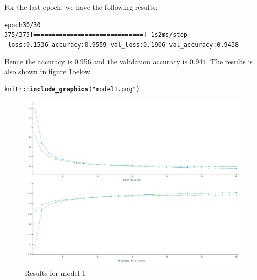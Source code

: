 \documentclass[10pt, a4paper, english]{article}\usepackage[]{graphicx}\usepackage[dvipsnames]{xcolor}
\makeatletter
\def\maxwidth{ %
  \ifdim\Gin@nat@width>\linewidth
    \linewidth
  \else
    \Gin@nat@width
  \fi
}
\newcommand{\hlstr}[1]{\textcolor[rgb]{0.192,0.494,0.8}{#1}}%
\newcommand{\hlopt}[1]{\textcolor[rgb]{0,0,0}{#1}}%
\newcommand{\hlstd}[1]{\textcolor[rgb]{0.345,0.345,0.345}{#1}}%
\newcommand{\hlkwd}[1]{\textcolor[rgb]{0.737,0.353,0.396}{\textbf{#1}}}%
\newenvironment{kframe}{%
 \def\at@end@of@kframe{}%
 \ifinner\ifhmode%
  \def\at@end@of@kframe{\end{minipage}}%
  \begin{minipage}{\columnwidth}%
 \fi\fi%
 \def\FrameCommand##1{\hskip\@totalleftmargin \hskip-\fboxsep
 \colorbox{shadecolor}{##1}\hskip-\fboxsep
     \hskip-\linewidth \hskip-\@totalleftmargin \hskip\columnwidth}%
 \MakeFramed {\advance\hsize-\width
   \@totalleftmargin\z@ \linewidth\hsize
   \@setminipage}}%
 {\par\unskip\endMakeFramed%
 \at@end@of@kframe}
\newenvironment{knitrout}{}{} %
\makeatother
\begin{document}
For the last epoch, we have the following results:
\begin{knitrout}
\color{fgcolor}\begin{kframe}
\begin{alltt}
epoch 30/30
375/375 [==============================] - 1s 2ms/step 
- loss: 0.1536 - accuracy: 0.9559 - val_loss: 0.1906 - val_accuracy: 0.9438
\end{alltt}
\end{kframe}
\end{knitrout}

Hence the accuracy is 0.956 and the validation accuracy is 0.944. The results is also shown in figure \ref{fig:model1}below
\begin{knitrout}
\color{fgcolor}\begin{kframe}
\begin{alltt}
\hlstd{knitr}\hlopt{::}\hlkwd{include_graphics}\hlstd{(}\hlstr{"model1.png"}\hlstd{)}
\end{alltt}
\end{kframe}\begin{figure}
\includegraphics[width=\maxwidth]{model1} \caption[Results for model 1]{Results for model 1}\label{fig:model1}
\end{figure}

\end{knitrout}
\end{document}
